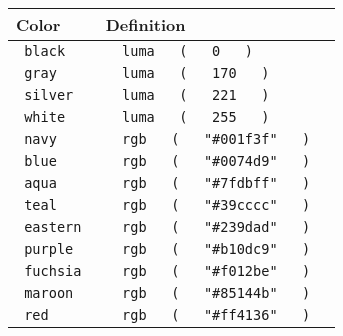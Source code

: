 \begin{longtable}[]{@{}ll@{}}
\toprule\noalign{}
Color & Definition \\
\midrule\noalign{}
\endhead
\bottomrule\noalign{}
\endlastfoot
\texttt{\ black\ } &
\texttt{\ }{\texttt{\ luma\ }}\texttt{\ }{\texttt{\ (\ }}\texttt{\ }{\texttt{\ 0\ }}\texttt{\ }{\texttt{\ )\ }}\texttt{\ } \\
\texttt{\ gray\ } &
\texttt{\ }{\texttt{\ luma\ }}\texttt{\ }{\texttt{\ (\ }}\texttt{\ }{\texttt{\ 170\ }}\texttt{\ }{\texttt{\ )\ }}\texttt{\ } \\
\texttt{\ silver\ } &
\texttt{\ }{\texttt{\ luma\ }}\texttt{\ }{\texttt{\ (\ }}\texttt{\ }{\texttt{\ 221\ }}\texttt{\ }{\texttt{\ )\ }}\texttt{\ } \\
\texttt{\ white\ } &
\texttt{\ }{\texttt{\ luma\ }}\texttt{\ }{\texttt{\ (\ }}\texttt{\ }{\texttt{\ 255\ }}\texttt{\ }{\texttt{\ )\ }}\texttt{\ } \\
\texttt{\ navy\ } &
\texttt{\ }{\texttt{\ rgb\ }}\texttt{\ }{\texttt{\ (\ }}\texttt{\ }{\texttt{\ "\#001f3f"\ }}\texttt{\ }{\texttt{\ )\ }}\texttt{\ } \\
\texttt{\ blue\ } &
\texttt{\ }{\texttt{\ rgb\ }}\texttt{\ }{\texttt{\ (\ }}\texttt{\ }{\texttt{\ "\#0074d9"\ }}\texttt{\ }{\texttt{\ )\ }}\texttt{\ } \\
\texttt{\ aqua\ } &
\texttt{\ }{\texttt{\ rgb\ }}\texttt{\ }{\texttt{\ (\ }}\texttt{\ }{\texttt{\ "\#7fdbff"\ }}\texttt{\ }{\texttt{\ )\ }}\texttt{\ } \\
\texttt{\ teal\ } &
\texttt{\ }{\texttt{\ rgb\ }}\texttt{\ }{\texttt{\ (\ }}\texttt{\ }{\texttt{\ "\#39cccc"\ }}\texttt{\ }{\texttt{\ )\ }}\texttt{\ } \\
\texttt{\ eastern\ } &
\texttt{\ }{\texttt{\ rgb\ }}\texttt{\ }{\texttt{\ (\ }}\texttt{\ }{\texttt{\ "\#239dad"\ }}\texttt{\ }{\texttt{\ )\ }}\texttt{\ } \\
\texttt{\ purple\ } &
\texttt{\ }{\texttt{\ rgb\ }}\texttt{\ }{\texttt{\ (\ }}\texttt{\ }{\texttt{\ "\#b10dc9"\ }}\texttt{\ }{\texttt{\ )\ }}\texttt{\ } \\
\texttt{\ fuchsia\ } &
\texttt{\ }{\texttt{\ rgb\ }}\texttt{\ }{\texttt{\ (\ }}\texttt{\ }{\texttt{\ "\#f012be"\ }}\texttt{\ }{\texttt{\ )\ }}\texttt{\ } \\
\texttt{\ maroon\ } &
\texttt{\ }{\texttt{\ rgb\ }}\texttt{\ }{\texttt{\ (\ }}\texttt{\ }{\texttt{\ "\#85144b"\ }}\texttt{\ }{\texttt{\ )\ }}\texttt{\ } \\
\texttt{\ red\ } &
\texttt{\ }{\texttt{\ rgb\ }}\texttt{\ }{\texttt{\ (\ }}\texttt{\ }{\texttt{\ "\#ff4136"\ }}\texttt{\ }{\texttt{\ )\ }}\texttt{\ } \\

\end{longtable}
